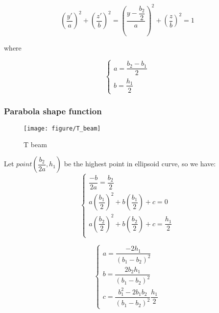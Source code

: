 \begin{equation*}
\left( \dfrac{y'}{a} \right) ^2 + \left( \dfrac{z'}{b} \right) ^2 = \left( \dfrac{y-\dfrac{b_2}{2}}{a} \right) ^2 + \left( \dfrac{z}{b} \right) ^2 = 1
\end{equation*}

where 

\begin{equation*}
\begin{cases*}
a = \dfrac{b_2-b_1}{2} \\
b = \dfrac{h_1}{2}
\end{cases*}
\end{equation*}

\subsubsection{Parabola shape function}
\begin{figure}[!h]
\centering
\texttt{[image: figure/T\_beam]}
\caption{T beam}
\label{fig:tbeam}
\end{figure}

Let $ point(\dfrac{b_2}{2 a}, h_1) $ be the highest point in ellipsoid curve, so we have:
\begin{equation*}
\begin{cases}
\dfrac{-b}{2 a} = \dfrac{b_2}{2} \\
a \left( \dfrac{b_1}{2} \right) ^2 + b \left(  \dfrac{b_1}{2}\right) + c = 0  \\
a \left( \dfrac{b_2}{2} \right) ^2 + b \left(  \dfrac{b_2}{2}\right) + c = \dfrac{h_1}{2}  \\
\end{cases}
\end{equation*}

\begin{equation*}
 \begin{cases}
 a = \dfrac{-2 h_1 }{(b_1-b_2)^2} \\
 b = \dfrac{2 b_2 h_1 }{(b_1-b_2)^2} \\
 c = \dfrac{b_1^2 - 2 b_1 b_2}{(b_1-b_2)^2} \dfrac{h_1}{2}
 \end{cases}
\end{equation*}

